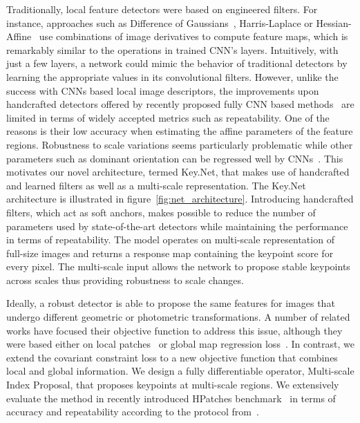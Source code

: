 Traditionally, local feature detectors were based on engineered filters. For instance, approaches such as Difference of Gaussians~\cite{SIFT}, Harris-Laplace or Hessian-Affine~\cite{mikolajczykIJCV2004} use combinations of image derivatives to compute feature maps, which is remarkably similar to the operations in trained CNN's layers. Intuitively, with just a few layers, a network could mimic the behavior of traditional detectors by learning the appropriate values in its convolutional filters. However, unlike the success with CNNs based local image descriptors, the improvements upon handcrafted detectors offered by recently proposed fully CNN based methods~\cite{LIFT,DeTone_MagicPoint17,Karel_Vedaldi_ECCV_16, Zhang_Felix_CVPR_17,OnoSerra18} are limited in terms of widely accepted metrics such as repeatability. One of the reasons is their low accuracy when estimating the affine parameters of the feature regions. Robustness to scale variations seems particularly problematic while other parameters such as dominant orientation can be regressed well by CNNs~\cite{Yi_Verdie_Fua_Lepetit_CVPR16, LIFT}. 
%
This motivates our novel architecture, termed Key.Net, that makes use of handcrafted and learned filters as well as a multi-scale representation. 
The Key.Net architecture is illustrated in figure~\ref{fig:net_architecture}. 
Introducing handcrafted filters, which act as soft anchors, makes possible to reduce the number of parameters used by state-of-the-art detectors while maintaining the performance in terms of repeatability. The model operates on multi-scale representation of full-size images and returns a response map containing the keypoint score for every pixel. The multi-scale input allows the network to propose stable keypoints across scales thus providing robustness to scale changes. 
%

Ideally, a robust detector is able to propose the same features for images that undergo different geometric or photometric transformations. A number of related works have focused their objective function to address this issue, although they were based either on local patches~\cite{Karel_Vedaldi_ECCV_16, Zhang_Felix_CVPR_17} or global map regression loss~\cite{detone2017superpoint, TILDE, OnoSerra18}. In contrast, we extend the covariant constraint loss to a new objective function that combines local and global information. We design a fully differentiable operator, Multi-scale Index Proposal, that proposes keypoints at multi-scale regions. We extensively evaluate the method in recently introduced HPatches benchmark~\cite{HPatches} in terms of accuracy and repeatability according to the protocol from~\cite{mikolajczykpami2005}.

